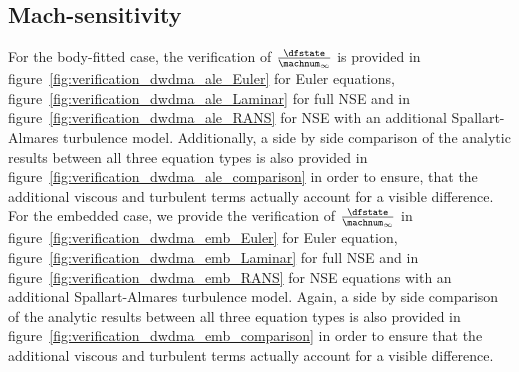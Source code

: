 \documentclass[../main.tex]{subfiles}
\begin{document}
\subsection{Mach-sensitivity}
For the body-fitted case, the verification of $\tfrac{\dfstate}{\machnum_{\infty}}$ is provided in figure~\ref{fig:verification_dwdma_ale_Euler} for Euler equations, figure~\ref{fig:verification_dwdma_ale_Laminar} for full \ac{NSE} and in figure~\ref{fig:verification_dwdma_ale_RANS} for \ac{NSE} with an additional Spallart-Almares turbulence model.
Additionally, a side by side comparison of the analytic results between all three equation types is also provided in figure~\ref{fig:verification_dwdma_ale_comparison} in order to ensure, that the additional viscous and turbulent terms actually account for a visible difference.\\
For the embedded case, we provide the verification of $\tfrac{\dfstate}{\machnum_{\infty}}$  in figure~\ref{fig:verification_dwdma_emb_Euler} for Euler equation, figure~\ref{fig:verification_dwdma_emb_Laminar} for full \ac{NSE} and in figure~\ref{fig:verification_dwdma_emb_RANS} for \ac{NSE} equations with an additional Spallart-Almares turbulence model.
Again, a side by side comparison of the analytic results between all three equation types is also provided in figure~\ref{fig:verification_dwdma_emb_comparison} in order to ensure that the additional viscous and turbulent terms actually account for a visible difference.
\end{document}
